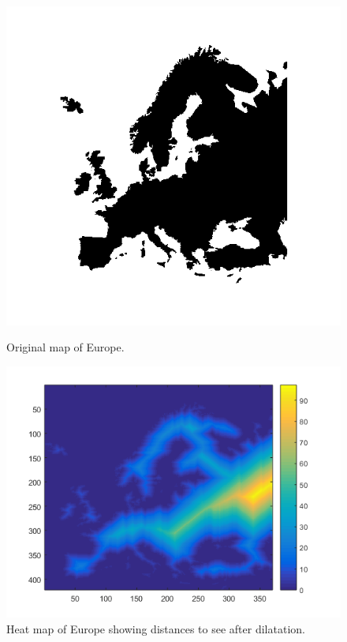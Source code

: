 \begin{figure}[H]
	\centering
	\begin{minipage}[t]{0.4\textwidth}
		\includegraphics[width=\textwidth]{images/eumap.png}
		\caption{Original map of Europe.}
		\label{fig:eumap}
	\end{minipage}
	\begin{minipage}[t]{0.4\textwidth}
		\includegraphics[width=\textwidth]{images/euheatmap.png}
		\caption{Heat map of Europe showing distances to see after dilatation.}
		\label{fig:euheatmap}
	\end{minipage}
\end{figure}


